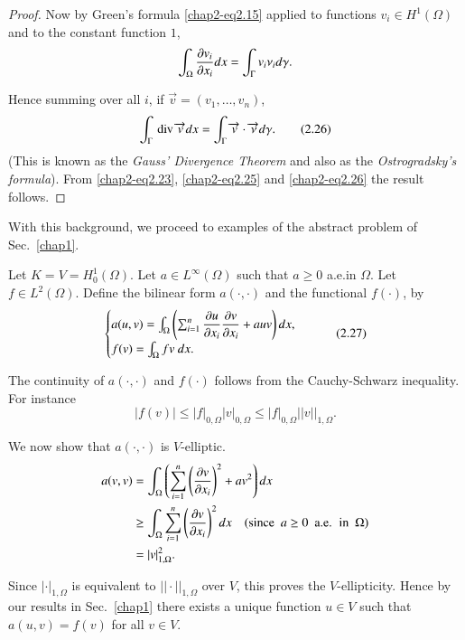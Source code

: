 \begin{proof}
Now by Green's formula \eqref{chap2-eq2.15} applied to functions
$v_{i}\in H^{1}(\Omega)$ and to the constant function $1$,
$$
\int_{\Omega}\frac{\partial v_{i}}{\partial x_{i}}dx=\int_{\Gamma}v_{i}\nu_{i}d\gamma.
$$

Hence summing over all $i$, if
$\overrightarrow{v}=(v_{1},\ldots,v_{n})$,
\begin{equation*}
\int_{\Gamma}\text{\,div\,}\overrightarrow{v}dx=\int_{\Gamma}\overrightarrow{v}\cdot
\overrightarrow{\nu}d\gamma.\tag{2.26}\label{chap2-eq2.26}  
\end{equation*}
(This is known as the {\em Gauss' Divergence Theorem} and also as the
    {\em Ostrogradsky's formula}). From \eqref{chap2-eq2.23},
    \eqref{chap2-eq2.25} and \eqref{chap2-eq2.26} the result follows.
\end{proof}

With this background, we proceed to examples of the abstract problem
of Sec.~\ref{chap1}.

\begin{example}\label{chap2-exam2.1}
Let $K=V=H^{1}_{0}(\Omega)$. Let $a\in L^{\infty}(\Omega)$ such that
$a\geq 0$ a.e.\@ in $\Omega$. Let $f\in L^{2}(\Omega)$. Define the
bilinear form $a(\cdot,\cdot)$ and the functional $f(\cdot)$, by
\begin{equation*}
\begin{cases}
a(u,v)=\int_{\Omega}\left(\sum^{n}_{i=1}\dfrac{\partial u}{\partial x_{i}}\dfrac{\partial
  v}{\partial x_{i}}+auv\right)dx,\\
f(v)=\int_{\Omega}fv\ dx.
\end{cases}\tag{2.27}\label{chap2-eq2.27}
\end{equation*}

The continuity of $a(\cdot,\cdot)$ and $f(\cdot)$ follows from the
Cauchy-Schwarz inequality. For instance
\begin{equation*}
|f(v)|\leq |f|_{0,\Omega}|v|_{0,\Omega}\leq
|f|_{0,\Omega}||v||_{1,\Omega}.\tag{2.28}\label{chap2-eq2.28} 
\end{equation*}

We now show that $a(\cdot,\cdot)$ is $V$-elliptic.
\begin{align*}
a(v,v) &= \int_{\Omega}\left(\sum^{n}_{i=1}\left(\frac{\partial v}{\partial
  x_{i}}\right)^{2}+av^{2}\right)dx\\ 
&\geq \int_{\Omega}\sum^{n}_{i=1}\left(\frac{\partial v}{\partial
  x_{i}}\right)^{2}dx\quad(\text{since~ } a\geq 0\text{~ a.e.~ in~
}\Omega)\\
&= |v|^{2}_{1,\Omega}.
\end{align*}\pageoriginale

Since $|\cdot|_{1,\Omega}$ is equivalent to $||\cdot||_{1,\Omega}$
over $V$, this proves the $V$-ellipticity. Hence by our results in
Sec.~\ref{chap1} there exists a unique function $u\in V$ such that
$a(u,v)=f(v)$ for all $v\in V$.
\end{example}

